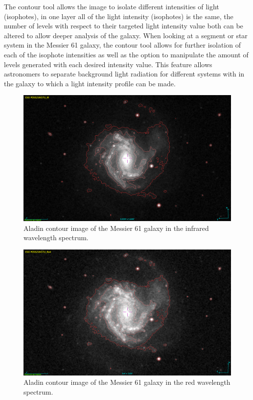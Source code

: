 \documentclass[12pt]{article}
\begin{document}
The contour tool allows the image to isolate different intensities of light (isophotes), in one layer all of the light intensity (isophotes) is the same, the number of levels with respect to their targeted light intensity value both can be altered to allow deeper analysis of the galaxy. When looking at a segment or star system in the Messier 61 galaxy, the contour tool allows for further isolation of each of the isophote intensities as well as the option to manipulate the amount of levels generated with each desired intensity value. This feature allows astronomers to separate background light radiation for different systems with in the galaxy to which a light intensity profile can be made. 

\begin{multicols}{2}
\begin{figure}[H]
\centering
\includegraphics[scale=0.22]{Images/As_Images/M61IRContour.png}
\caption{Aladin contour image of the Messier 61 galaxy in the infrared wavelength spectrum.}
\label{Aladin IR Contour image of the Messier 61 galaxy}
\end{figure}

\begin{figure}[H]
\centering
\includegraphics[scale=0.22]{Images/As_Images/M61RedContour.png}
\caption{Aladin contour image of the Messier 61 galaxy in the red wavelength spectrum.}
\label{Aladin Red Contour image of the Messier 61 galaxy}
\end{figure}
\end{multicols}
\end{document}
